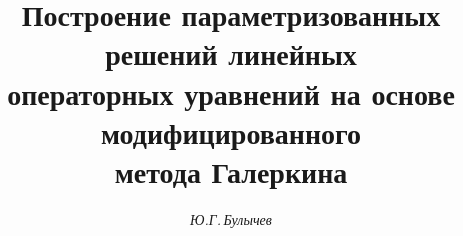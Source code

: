 









\newcommand{\la}{\langle}


\newcommand{\ra}{\rangle}


\newcommand{\up}[2]{\overset{#1}{#2}{}}


\newcommand{\tts}[1]{}


\renewcommand{\baselinestretch}{0.96}










\setcounter{page}{21}












\author{\it Ю.Г.\,Булычев}




\title{Построение параметризованных решений линейных\\


операторных уравнений на основе модифицированного\\


метода Галеркина}





\date{}







